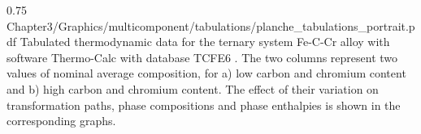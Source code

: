 %
%
\begin{figureth}
{0.75}
{Chapter3/Graphics/multicomponent/tabulations/planche_tabulations_portrait.pdf}
{Tabulated thermodynamic data for the ternary system Fe-C-Cr alloy with software 
Thermo-Calc \citep{andersson_thermo-calc_2002}  with database TCFE6 \citep{tcfe6_tcfe6:_2010}.
The two columns represent two values of nominal average composition, for a) low carbon and chromium content
and b) high carbon and chromium content.
The effect of their variation on transformation paths, phase compositions and phase enthalpies is shown in the corresponding graphs.}
\label{fig:ternary_tabulations}
\end{figureth}
%
